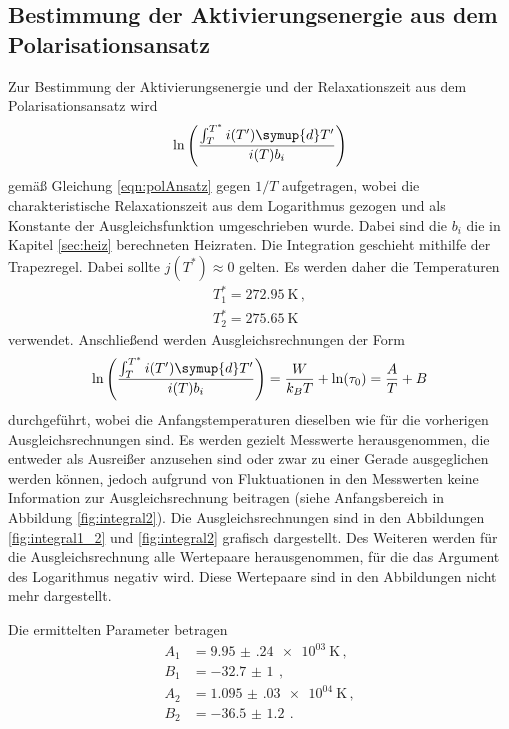 \newpage
\subsection{Bestimmung der Aktivierungsenergie aus dem Polarisationsansatz}
\label{subsec:polarisation}

Zur Bestimmung der Aktivierungsenergie und der Relaxationszeit aus dem Polarisationsansatz wird
\begin{equation*}
	\ln\left(\frac{\int_T^{T^*}i(T') \symup{d}T'}{i(T) b_i}\right)
\end{equation*}
gemäß Gleichung \eqref{eqn:polAnsatz} gegen $1/T$ aufgetragen, wobei die charakteristische Relaxationszeit aus dem Logarithmus gezogen und als Konstante der Ausgleichsfunktion umgeschrieben wurde. Dabei sind die $b_i$ die in Kapitel \ref{sec:heiz}
berechneten Heizraten. Die Integration geschieht mithilfe der Trapezregel. Dabei sollte $j(T^*)\approx 0$ gelten. Es werden daher die Temperaturen
\begin{align*}
	T_1^*=\SI{272.95}{\kelvin} \,, \\
	T_2^*=\SI{275.65}{\kelvin}
\end{align*}
verwendet.
Anschließend werden Ausgleichsrechnungen der Form
\begin{equation*}
	\ln\left(\frac{\int_T^{T^*}i(T') \symup{d}T'}{i(T) b_i}\right) =\frac{W}{k_B T}+\ln(\tau_0)=\frac{A}{T}+B
\end{equation*}
durchgeführt, wobei die Anfangstemperaturen dieselben wie für die vorherigen Ausgleichsrechnungen sind. Es werden gezielt Messwerte herausgenommen, die entweder als Ausreißer anzusehen sind oder zwar zu einer Gerade ausgeglichen werden können, jedoch aufgrund von Fluktuationen in den Messwerten keine Information zur Ausgleichsrechnung beitragen (siehe Anfangsbereich in Abbildung \ref{fig:integral2}). Die Ausgleichsrechnungen sind in den
Abbildungen \ref{fig:integral1_2} und \ref{fig:integral2} grafisch dargestellt.
Des Weiteren werden für die Ausgleichsrechnung alle Wertepaare herausgenommen, für die das Argument des Logarithmus negativ wird. Diese Wertepaare sind in den Abbildungen nicht mehr dargestellt.

Die ermittelten Parameter betragen
\begin{align*}
  A_1&=\SI{9.95(24)e+03}{\kelvin} \,, \\
  B_1&=\SI{-32.7(10)}{}  \,, \\
  A_2&=\SI{1.095(030)e+04}{\kelvin} \,, \\
  B_2&=\SI{-36.5(12)}{}  \,.
\end{align*}

